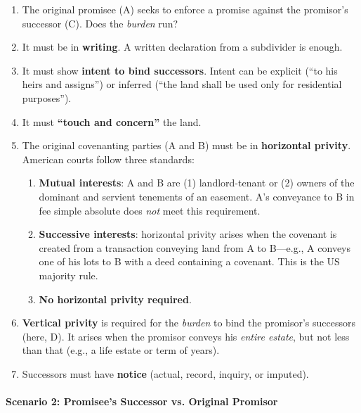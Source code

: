 \begin{enumerate}
    \item The original promisee (A) seeks to enforce a promise against the 
    promisor's  successor (C). Does the \emph{burden} run?
    \item It must be in \textbf{writing}. A written declaration from a 
    subdivider is enough.
    \item It must show \textbf{intent to bind successors}. Intent can be 
    explicit (``to his heirs and assigns'') or inferred (``the land shall be 
    used only for residential purposes'').
    \item It must \textbf{``touch and concern''} the land.
    \item The original covenanting parties (A and B) must be in 
    \textbf{horizontal privity}. American courts follow three standards:
    \begin{enumerate}
        \item \textbf{Mutual interests}: A and B are (1) landlord-tenant or 
        (2) owners of the dominant and servient tenements of an easement. A's 
        conveyance to B in fee simple absolute does \emph{not} meet this 
        requirement.
        \item \textbf{Successive interests}: horizontal privity arises when 
        the covenant is created from a transaction conveying land from A to 
        B---e.g., A conveys one of his lots to B with a deed containing a 
        covenant. This is the US majority rule.
        \item \textbf{No horizontal privity required}.
    \end{enumerate}
    \item \textbf{Vertical privity} is required for the \emph{burden} to bind 
    the promisor's successors (here, D). It arises when the promisor conveys 
    his \emph{entire estate}, but not less than that (e.g., a life estate or 
    term of years).
    \item Successors must have \textbf{notice} (actual, record, inquiry, or 
    imputed).
\end{enumerate}

\paragraph{Scenario 2: Promisee's Successor vs. Original Promisor}

